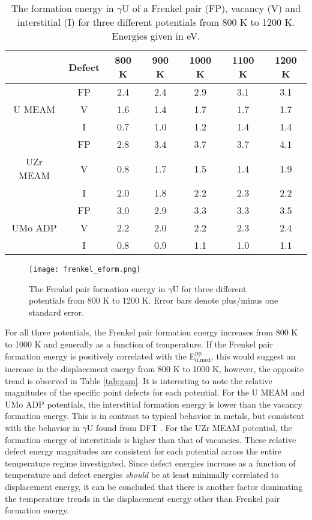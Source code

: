 \documentclass[review]{elsarticle}
\begin{document}
\begin{table}[h]
\caption{The formation energy in $\gamma$U of a Frenkel pair (FP), vacancy (V) and interstitial (I) for three different potentials from 800 K to 1200 K. Energies given in eV.} \label{tab:eform}
\begin{center}
\begin{tabular}{|c|c|c|c|c|c|c|}
	\hline
			& Defect	& 800 K & 900 K & 1000 K & 1100 K & 1200 K\\
	 \hline
			& FP	 & 2.4 & 2.4 & 2.9 & 3.1 & 3.1 \\
	 U MEAM 	& V	& 1.6 & 1.4 & 1.7 & 1.7 & 1.7 \\
	 		& I	& 0.7 & 1.0 & 1.2 & 1.4 & 1.4 \\
	\hline
	 		& FP	& 2.8 & 3.4 & 3.7 & 3.7 & 4.1 \\
	 UZr MEAM & V & 0.8 & 1.7 & 1.5 & 1.4 & 1.9 \\
			& I	& 2.0 & 1.8 & 2.2 & 2.3 & 2.2 \\
	 \hline
	 		& FP	& 3.0 & 2.9 & 3.3 & 3.3 & 3.5 \\
	 UMo ADP & V	& 2.2 & 2.0 & 2.2 & 2.3 & 2.4 \\
	 		& I	& 0.8 & 0.9 & 1.1 & 1.0 & 1.1 \\
	 \hline
\end{tabular}
\end{center}
\label{default}
\end{table}

\begin{figure}[h]
 \centering
 \texttt{[image: frenkel\_eform.png]} 
 \caption{The Frenkel pair formation energy in $\gamma$U for three different potentials from 800 K to 1200 K. Error bars denote plus/minus one standard error.}
 \label{fig:eform}
\end{figure}

\FloatBarrier

For all three potentials, the Frenkel pair formation energy increases from 800 K to 1000 K and generally as a function of temperature. If the Frenkel pair formation energy is positively correlated with the E$^{\textrm{pp}}_{\textrm{d,med}}$, this would suggest an increase in the displacement energy from 800 K to 1000 K, however, the opposite trend is observed in Table \ref{tab:gam}. It is interesting to note the relative magnitudes of the specific point defects for each potential. For the U MEAM and UMo ADP potentials, the interstitial formation energy is lower than the vacancy formation energy. This is in contrast to typical behavior in metals, but consistent with the behavior in $\gamma$U found from DFT \cite{beeler2010}. For the UZr MEAM potential, the formation energy of interstitials is higher than that of vacancies. These relative defect energy magnitudes are consistent for each potential across the entire temperature regime investigated. Since defect energies increase as a function of temperature and defect energies \textit{should} be at least minimally correlated to displacement energy, it can be concluded that there is another factor dominating the temperature trends in the displacement energy other than Frenkel pair formation energy.
\end{document}
